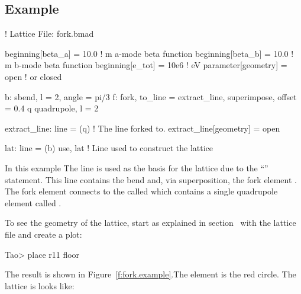 \documentclass{hitec}     %
\begin{document}
{%
\subsection{Example}

\begin{code}
! Lattice File: fork.bmad

beginning[beta_a] = 10.0        ! m  a-mode beta function
beginning[beta_b] = 10.0        ! m  b-mode beta function
beginning[e_tot] = 10e6         ! eV 
parameter[geometry] = open      ! or closed

b: sbend, l = 2, angle = pi/3
f: fork, to_line = extract_line, superimpose, offset = 0.4
q quadrupole, l = 2

extract_line: line = (q)       ! The line forked to.
extract_line[geometry] = open

lat: line = (b)
use, lat                ! Line used to construct the lattice
\end{code}

In this example The  line is used as the basis for the lattice due to the ``''
statement.  This line contains the bend  and, via superposition, the fork element . The
fork element  connects to the  called  which contains a single 
quadrupole element called . 

To see the geometry of the lattice, start \tao as explained in section~ with the
lattice file  and create a  plot:
\begin{code}
Tao> place r11 floor
\end{code}

The result is shown in Figure~\ref{f:fork.example}.The  element is the red circle.
The lattice is looks like:

}
\end{document}
